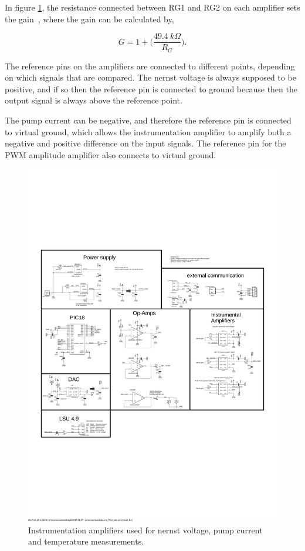 In figure \ref{fig:INA_schematic}, the resistance connected between RG1 and RG2 on each amplifier sets the gain~\cite{INA826}, where the gain can be calculated by,

\begin{equation}
    G = 1 + \bigg(\frac{49.4~k\Omega}{R_G}\bigg).
\end{equation}

The reference pins on the amplifiers are connected to different points, depending on which signals that are compared. The nernst voltage is always supposed to be positive, and if so then the reference pin is connected to ground because then the output signal is always above the reference point.

The pump current can be negative, and therefore the reference pin is connected to virtual ground, which allows the instrumentation amplifier to amplify both a negative and positive difference on the input signals. The reference pin for the PWM amplitude amplifier also connects to virtual ground.


\begin{figure}
    \centering
    \includegraphics[width=.7\textwidth]{Chapter3/Figures/instrumental_schematic.pdf}
    \caption{Instrumentation amplifiers used for nernst voltage, pump current and temperature measurements.}
    \label{fig:INA_schematic}
\end{figure}


